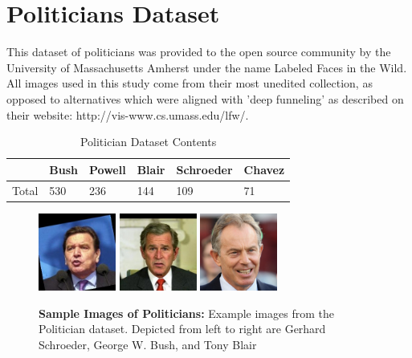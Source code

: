\documentclass[conference,11pt]{IEEEtran}
\begin{document}
\section{Politicians Dataset}
This dataset of politicians was provided to the open source community by the University of Massachusetts Amherst under the name Labeled Faces in the Wild.  All images used in this study come from their most unedited collection, as opposed to alternatives which were aligned with 'deep funneling' as described on their website: http://vis-www.cs.umass.edu/lfw/.

\begin{table}[H]
    \caption{Politician Dataset Contents}
    \centering
    \begin{tabular}{ |p{1cm}||p{.8cm}|p{1cm}|p{1cm}| p{1.3cm}| p{.9cm}|}
        \hline
            &Bush &Powell &Blair &Schroeder &Chavez \\
        \hline
        Total & 530 &236 &144 &109 &71\\
        \hline
    \end{tabular}
\end{table}

\vspace{-1.5em}
\begin{figure}[ht]
    \centering
    \includegraphics[width=1in]{pictures/politicians/schroeder-sample.jpg}
    \includegraphics[width=1in]{pictures/politicians/bush-sample.jpg}
    \includegraphics[width=1in]{pictures/politicians/blair-sample.png}
    \caption{\textbf{Sample Images of Politicians:} Example images from the Politician dataset.  Depicted from left to right are Gerhard Schroeder, George W. Bush, and Tony Blair}
\end{figure}
\end{document}
